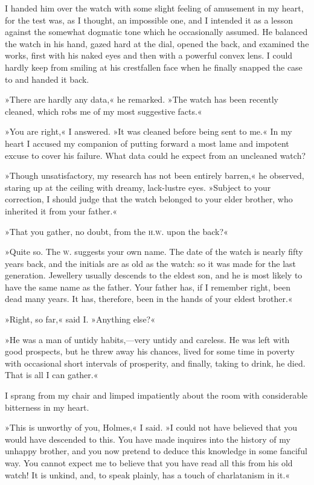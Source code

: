 I handed him over the watch with some slight feeling of amusement in my heart, for the test was, as I thought, an impossible one, and I intended it as a lesson against the somewhat dogmatic tone which he occasionally assumed. He balanced the watch in his hand, gazed hard at the dial, opened the back, and examined the works, first with his naked eyes and then with a powerful convex lens. I could hardly keep from smiling at his crestfallen face when he finally snapped the case to and handed it back.

»There are hardly any data,« he remarked. »The watch has been recently cleaned, which robs me of my most suggestive facts.«

»You are right,« I answered. »It was cleaned before being sent to me.« In my heart I accused my companion of putting forward a most lame and impotent excuse to cover his failure. What data could he expect from an uncleaned watch?

»Though unsatisfactory, my research has not been entirely barren,« he observed, staring up at the ceiling with dreamy, lack-lustre eyes. »Subject to your correction, I should judge that the watch belonged to your elder brother, who inherited it from your father.«

»That you gather, no doubt, from the \textsc{h.w.} upon the back?«

»Quite so. The \textsc{w.} suggests your own name. The date of the watch is nearly fifty years back, and the initials are as old as the watch: so it was made for the last generation. Jewellery usually descends to the eldest son, and he is most likely to have the same name as the father. Your father has, if I remember right, been dead many years. It has, therefore, been in the hands of your eldest brother.«

»Right, so far,« said I. »Anything else?«

»He was a man of untidy habits,—very untidy and careless. He was left with good prospects, but he threw away his chances, lived for some time in poverty with occasional short intervals of prosperity, and finally, taking to drink, he died. That is all I can gather.«

I sprang from my chair and limped impatiently about the room with considerable bitterness in my heart.

»This is unworthy of you, Holmes,« I said. »I could not have believed that you would have descended to this. You have made inquires into the history of my unhappy brother, and you now pretend to deduce this knowledge in some fanciful way. You cannot expect me to believe that you have read all this from his old watch! It is unkind, and, to speak plainly, has a touch of charlatanism in it.«

